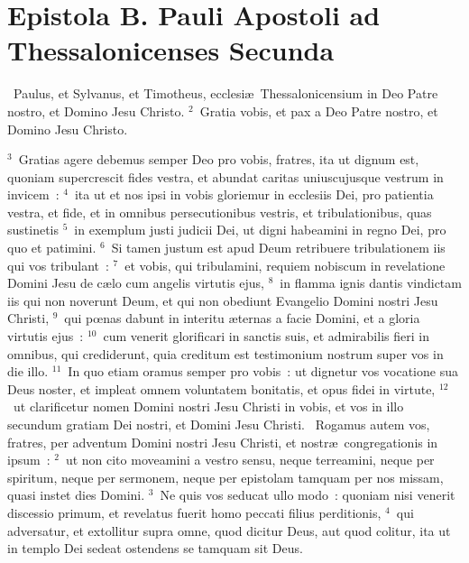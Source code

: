 \clearpage
{\centering \section*{Epistola B. Pauli Apostoli ad Thessalonicenses Secunda}}\thispagestyle{empty}

~Paulus, et Sylvanus, et Timotheus, ecclesi\ae\ Thessalonicensium in Deo Patre nostro, et Domino Jesu Christo.
${}^{2}$~Gratia vobis, et pax a Deo Patre nostro, et Domino Jesu Christo.


${}^{3}$~Gratias agere debemus semper Deo pro vobis, fratres, ita ut dignum est, quoniam supercrescit fides vestra, et abundat caritas uniuscujusque vestrum in invicem~:
${}^{4}$~ita ut et nos ipsi in vobis gloriemur in ecclesiis Dei, pro patientia vestra, et fide, et in omnibus persecutionibus vestris, et tribulationibus, quas sustinetis
${}^{5}$~in exemplum justi judicii Dei, ut digni habeamini in regno Dei, pro quo et patimini.
${}^{6}$~Si tamen justum est apud Deum retribuere tribulationem iis qui vos tribulant~:
${}^{7}$~et vobis, qui tribulamini, requiem nobiscum in revelatione Domini Jesu de c\ae lo cum angelis virtutis ejus,
${}^{8}$~in flamma ignis dantis vindictam iis qui non noverunt Deum, et qui non obediunt Evangelio Domini nostri Jesu Christi,
${}^{9}$~qui pœnas dabunt in interitu \ae ternas a facie Domini, et a gloria virtutis ejus~:
${}^{10}$~cum venerit glorificari in sanctis suis, et admirabilis fieri in omnibus, qui crediderunt, quia creditum est testimonium nostrum super vos in die illo.
${}^{11}$~In quo etiam oramus semper pro vobis~: ut dignetur vos vocatione sua Deus noster, et impleat omnem voluntatem bonitatis, et opus fidei in virtute,
${}^{12}$~ut clarificetur nomen Domini nostri Jesu Christi in vobis, et vos in illo secundum gratiam Dei nostri, et Domini Jesu Christi.
~Rogamus autem vos, fratres, per adventum Domini nostri Jesu Christi, et nostr\ae\ congregationis in ipsum~:
${}^{2}$~ut non cito moveamini a vestro sensu, neque terreamini, neque per spiritum, neque per sermonem, neque per epistolam tamquam per nos missam, quasi instet dies Domini.
${}^{3}$~Ne quis vos seducat ullo modo~: quoniam nisi venerit discessio primum, et revelatus fuerit homo peccati filius perditionis,
${}^{4}$~qui adversatur, et extollitur supra omne, quod dicitur Deus, aut quod colitur, ita ut in templo Dei sedeat ostendens se tamquam sit Deus.
